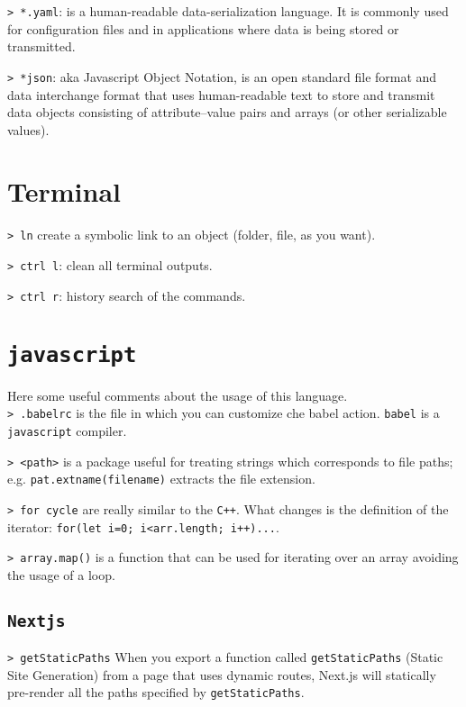 \documentclass[11pt]{article}
\newcommand{\cmd}[1]{\colorbox{light-gray}{\textcolor{gio}{\texttt{#1}}}}
\begin{document}
\begin{multicols}{2}
\cmd{> *.yaml}: is a human-readable data-serialization language. It is commonly 
used for configuration files and in applications where data is being stored or 
transmitted.

\cmd{> *json}: aka Javascript Object Notation, is an open standard file format 
and data interchange format that uses human-readable text to store and transmit
 data objects consisting of attribute–value pairs and arrays (or other serializable values). 

\section{Terminal}

\cmd{> ln} create a symbolic link to an object (folder, file, as you want).

\cmd{> ctrl l}: clean all terminal outputs.

\cmd{> ctrl r}: history search of the commands.

\section{\texttt{javascript}}

Here some useful comments about the usage of this language. \\

\cmd{> .babelrc} is the file in which you can customize che babel action. 
\texttt{babel} is a \texttt{javascript} compiler.

\cmd{> <path>} is a package useful for treating strings which corresponds to 
file paths; e.g. \texttt{pat.extname(filename)} extracts the file extension.

\cmd{> for cycle} are really similar to the \texttt{C++}. What changes is the 
definition of the iterator: \texttt{for(let i=0; i<arr.length; i++){...}}.

\cmd{> array.map()} is a function that can be used for iterating over an array 
avoiding the usage of a loop.

\subsection{\texttt{Nextjs}}

\cmd{> getStaticPaths} When you export a function called \texttt{getStaticPaths} 
(Static Site Generation) from a page that uses dynamic routes, Next.js will 
statically pre-render all the paths specified by \texttt{getStaticPaths}.


\end{multicols}
\end{document}
